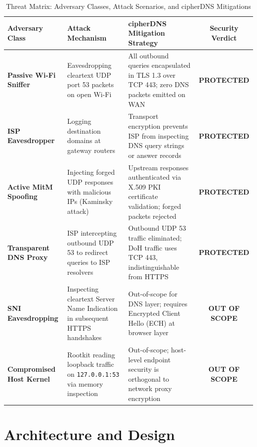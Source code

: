 \documentclass[10pt,a4paper]{article}
\begin{document}
\begin{table}[H]
\centering
\small
\caption{Threat Matrix: Adversary Classes, Attack Scenarios, and cipherDNS Mitigations}
\label{tab:threat_model}
\begin{tabularx}{\textwidth}{l p{4.2cm} X c}
\toprule
\textbf{Adversary Class} & \textbf{Attack Mechanism} & \textbf{cipherDNS Mitigation Strategy} & \textbf{Security Verdict} \\
\midrule
\textbf{Passive Wi-Fi Sniffer} & Eavesdropping cleartext UDP port 53 packets on open Wi-Fi & All outbound queries encapsulated in TLS 1.3 over TCP 443; zero DNS packets emitted on WAN & \textcolor{emeraldpass}{\textbf{PROTECTED}} \\
\addlinespace
\textbf{ISP Eavesdropper} & Logging destination domains at gateway routers & Transport encryption prevents ISP from inspecting DNS query strings or answer records & \textcolor{emeraldpass}{\textbf{PROTECTED}} \\
\addlinespace
\textbf{Active MitM Spoofing} & Injecting forged UDP responses with malicious IPs (Kaminsky attack) & Upstream responses authenticated via X.509 PKI certificate validation; forged packets rejected & \textcolor{emeraldpass}{\textbf{PROTECTED}} \\
\addlinespace
\textbf{Transparent DNS Proxy} & ISP intercepting outbound UDP 53 to redirect queries to ISP resolvers & Outbound UDP 53 traffic eliminated; DoH traffic uses TCP 443, indistinguishable from HTTPS & \textcolor{emeraldpass}{\textbf{PROTECTED}} \\
\addlinespace
\textbf{SNI Eavesdropping} & Inspecting cleartext Server Name Indication in subsequent HTTPS handshakes & Out-of-scope for DNS layer; requires Encrypted Client Hello (ECH) at browser layer & \textcolor{amberwarn}{\textbf{OUT OF SCOPE}} \\
\addlinespace
\textbf{Compromised Host Kernel} & Rootkit reading loopback traffic on \texttt{127.0.0.1:53} via memory inspection & Out-of-scope; host-level endpoint security is orthogonal to network proxy encryption & \textcolor{amberwarn}{\textbf{OUT OF SCOPE}} \\
\bottomrule
\end{tabularx}
\end{table}

\section{Architecture and Design}
\end{document}
